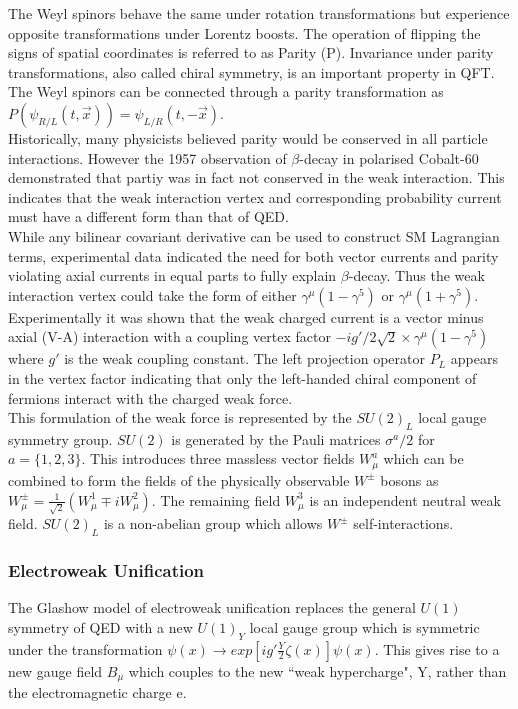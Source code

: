 The Weyl spinors behave the same under rotation transformations but experience opposite transformations under Lorentz boosts. The operation of flipping the signs of spatial coordinates is referred to as Parity (P). Invariance under parity transformations, also called chiral symmetry, is an important property in QFT. The Weyl spinors can be connected through a parity transformation as $P(\psi_{R/L}(t,\vec{x}))=\psi_{L/R}(t,-\vec{x})$.\\

Historically, many physicists believed parity would be conserved in all particle interactions. However the 1957 observation of $\beta$-decay in polarised Cobalt-60 demonstrated that partiy was in fact not conserved in the weak interaction. This indicates that the weak interaction vertex and corresponding probability current must have a different form than that of QED.\\

While any bilinear covariant derivative can be used to construct SM Lagrangian terms, experimental data indicated the need for both vector currents and parity violating axial currents in equal parts to fully explain $\beta$-decay. Thus the weak interaction vertex could take the form of either $\gamma^{\mu}(1-\gamma^5)$ or $\gamma^{\mu}(1+\gamma^5)$. Experimentally it was shown that the weak charged current is a vector minus axial (V-A) interaction with a coupling vertex factor $-ig'/2\sqrt{2}\times\gamma^{\mu}(1-\gamma^5)$ where $g'$ is the weak coupling constant. The left projection operator $P_L$ appears in the vertex factor indicating that only the left-handed chiral component of fermions interact with the charged weak force.\\

This formulation of the weak force is represented by the $SU(2)_L$ local gauge symmetry group. $SU(2)$ is generated by the Pauli matrices $\sigma^a/2$ for $a=\{1,2,3\}$. This introduces three massless vector fields $W_{\mu}^a$ which can be combined to form the fields of the physically observable $W^{\pm}$ bosons as $W^{\pm}_{\mu}=\frac{1}{\sqrt{2}}(W_{\mu}^1\mp iW_{\mu}^2)$. The remaining field $W_{\mu}^3$ is an independent neutral weak field. $SU(2)_L$ is a non-abelian group which allows $W^{\pm}$ self-interactions.

\subsubsection{Electroweak Unification}\label{sec:ew}
The Glashow model of electroweak unification replaces the general $U(1)$ symmetry of QED with a new $U(1)_Y$ local gauge group which is symmetric under the transformation $\psi(x)\rightarrow exp[ig'\frac{Y}{2}\zeta(x)]\psi(x)$. This gives rise to a new gauge field $B_{\mu}$ which couples to the new ``weak hypercharge", Y, rather than the electromagnetic charge e.\\ 

